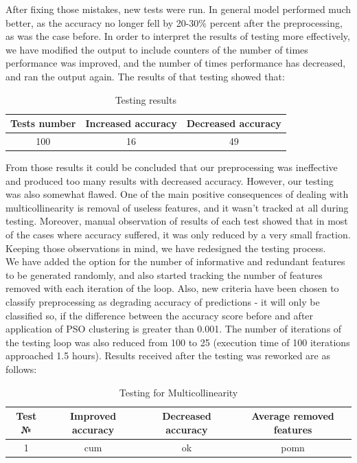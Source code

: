 \documentclass[conference]{IEEEtran}
\begin{document}
After fixing those mistakes, new tests were run. In general model performed much better, as the accuracy no longer fell by 20-30\% percent after the preprocessing, as was the case before. In order to interpret the results of testing more effectively, we have modified the output to include counters of the number of times performance was improved, and the number of times performance has decreased, and ran the output again. The results of that testing showed that:

\begin{table}[htbp]
	\caption{Testing results}
	\begin{center}
		\begin{tabular}{|c|c|c|}
			\hline
			\textbf{Tests number}&\textbf{Increased accuracy}&\textbf{Decreased accuracy} \\
			\hline
			100&16&49\\
			\hline
		\end{tabular}
		\label{tab1}
	\end{center}
\end{table}

From those results it could be concluded that our preprocessing was ineffective and produced too many results with decreased accuracy. However, our testing was also somewhat flawed. One of the main positive consequences of dealing with multicollinearity is removal of useless features, and it wasn't tracked at all during testing. Moreover, manual observation of results of each test showed that in most of the cases where accuracy suffered, it was only reduced by a very small fraction. Keeping those observations in mind, we have redesigned the testing process.\\

We have added the option for the number of informative and redundant features to be generated randomly, and also started tracking the number of features removed with each iteration of the loop. Also, new criteria have been chosen to classify preprocessing as degrading accuracy of predictions - it will only be classified so, if the difference between the accuracy score before and after application of PSO clustering is greater than 0.001. The number of iterations of the testing loop was also reduced from 100 to 25 (execution time of 100 iterations approached 1.5 hours). Results received after the testing was reworked are as follows:

\begin{table}[htbp]
	\caption{Testing for Multicollinearity}
	\begin{center}
		\begin{tabular}{|c|c|c|c|}
			\hline
			\textbf{Test №}&\textbf{Improved accuracy}&\textbf{Decreased accuracy}&\textbf{Average removed features} \\
			\hline 
			1& cum& ok& pomn \\
			\hline
		\end{tabular}
		\label{tab2}
	\end{center}
\end{table}
\end{document}
